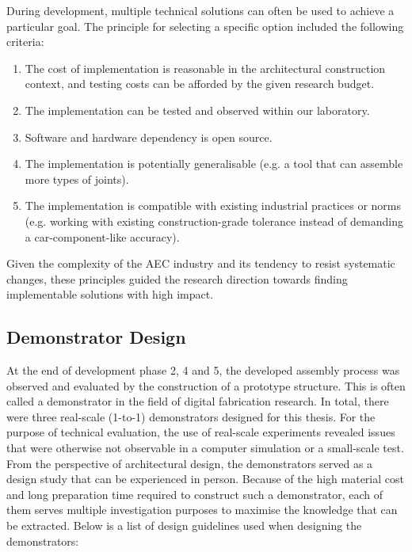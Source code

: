 During development, multiple technical solutions can often be used to achieve a particular goal. The principle for selecting a specific option included the following criteria: 

\begin{enumerate}[nosep]
	\item The cost of implementation is reasonable in the architectural construction context, and testing costs can be afforded by the given research budget.
	\item The implementation can be tested and observed within our laboratory.
	\item Software and hardware dependency is open source.
	\item The implementation is potentially generalisable (e.g. a tool that can assemble more types of joints).
	\item The implementation is compatible with existing industrial practices or norms (e.g. working with existing construction-grade tolerance instead of demanding a car-component-like accuracy).
\end{enumerate}

Given the complexity of the AEC industry and its tendency to resist systematic changes, these principles guided the research direction towards finding implementable solutions with high impact.

\subsection{Demonstrator Design}
\label{subsection:methodology-demonstraror-design}

At the end of development phase 2, 4 and 5, the developed assembly process was observed and evaluated by the construction of a prototype structure. This is often called a demonstrator in the field of digital fabrication research. In total, there were three real-scale (1-to-1) demonstrators designed for this thesis. For the purpose of technical evaluation, the use of real-scale experiments revealed issues that were otherwise not observable in a computer simulation or a small-scale test. From the perspective of architectural design, the demonstrators served as a design study that can be experienced in person. Because of the high material cost and long preparation time required to construct such a demonstrator, each of them serves multiple investigation purposes to maximise the knowledge that can be extracted. Below is a list of design guidelines used when designing the demonstrators:

